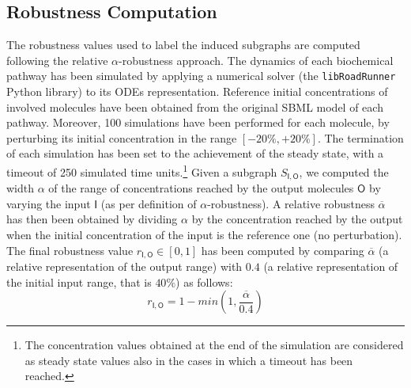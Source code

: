\subsection{Robustness Computation}\label{sec:robustness-computation}
The robustness values used to label the induced subgraphs are computed following the relative $\alpha$-robustness approach. The dynamics of each biochemical pathway has been simulated by applying a numerical solver (the \texttt{libRoadRunner} Python library) to its ODEs representation. Reference initial concentrations of involved molecules have been obtained from the original SBML model of each pathway. Moreover, 100 simulations have been performed for each molecule, by perturbing its initial concentration in the range $[-20\%,+20\%]$. The termination of each simulation has been set to the achievement of the steady state, with a timeout of 250 simulated time units.\footnote{The concentration values obtained at the end of the simulation are considered as steady state values also in the cases in which a timeout has been reached.} Given a subgraph $S_{\mathsf{I}, \mathsf{O}}$, we computed the width $\alpha$ of the range of concentrations reached by the output molecules $\mathsf{O}$ by varying the input $\mathsf{I}$ (as per definition of $\alpha$-robustness). A relative robustness $\overline{\alpha}$ has then been obtained by dividing $\alpha$ by the concentration reached by the output when the initial concentration of the input is the reference one (no perturbation). The final robustness value $r_{\mathsf{I}, \mathsf{O}} \in [0,1]$ has been computed by comparing $\overline{\alpha}$ (a relative representation of the output range) with $0.4$ (a relative representation of the initial input range, that is $40\%$) as follows:
\[
    r_{\mathsf{I}, \mathsf{O}} = 1 - min (1,\frac{\overline{\alpha}}{0.4})
\]

